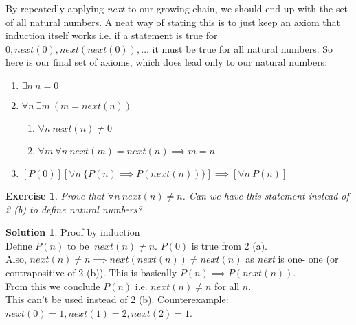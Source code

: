 \documentclass[a4paper,10pt]{article}
\newtheorem{exercise}{Exercise}[section]
\theoremstyle{definition} %
\newtheorem*{solution}{Solution}
\begin{document}
    By repeatedly applying \emph{next} to our growing chain, we should end up 
    with the set of all natural numbers. A neat way of stating this is to just
    keep an axiom that induction itself works i.e. if a statement is true for 
    $0, next(0), next(next(0)), \dots$ it must be true for all natural numbers.
    So here is our final set of axioms, which does lead only to our natural numbers:

    \begin{tcolorbox}[colback=blue!10!white, colframe=blue!50!black]
        \begin{enumerate}
            \item $\exists n \ n = 0$
            \item $\forall n \ \exists m \ (m = next(n))$
            \begin{enumerate}
                \item $\forall n \ next(n) \neq 0$
                \item $\forall m \ \forall n \ next(m) = next(n) \implies m = n$
            \end{enumerate}
            \item $[P(0)]  [\forall n \ \{P(n) \implies P(next(n))\}] \implies [\forall n \ P(n)]$
        \end{enumerate}
    \end{tcolorbox}

    \begin{exercise}
        Prove that $\forall n \ next(n) \neq n$. Can we have this statement instead of 
        2 (b) to define natural numbers?
    \end{exercise}
    \begin{solution}
        Proof by induction \\
        Define $P(n)$ to be $\ next(n) \neq n$. $P(0)$ is true from 2 (a). \\
        Also, $next(n) \neq n \implies next(next(n)) \neq next(n)$ as \emph{next} is one-
        one (or contrapositive of 2 (b)). This is basically $P(n) \implies P(next(n))$. \\
        From this we conclude $P(n)$ i.e. $next(n) \neq n$ for all $n$. \\
        This can't be used instead of 2 (b). Counterexample: $next(0) = 1, next(1) = 2, next(2) = 1$.
    \end{solution}
\end{document}
